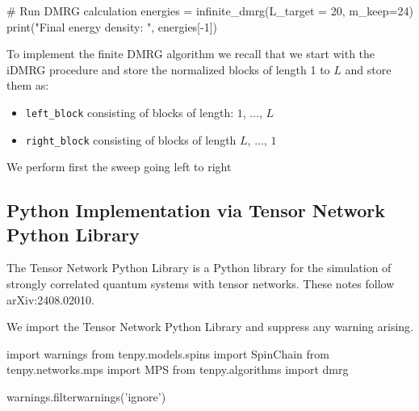\documentclass{article}
\begin{document}
\vspace{1em}

\begin{python}
    # Run DMRG calculation
    energies = infinite_dmrg(L_target = 20, m_keep=24)
    print("Final energy density: ", energies[-1])
\end{python}

\vspace{1em}

\noindent To implement the finite DMRG algorithm we recall that we start with the iDMRG procedure and store the normalized blocks of length 1 to $L$ and store them as:

\begin{itemize}
    \item \verb|left_block| consisting of blocks of length: $1$, ..., $L$
    \item \verb|right_block| consisting of blocks of length $L$, ..., $1$
\end{itemize}

\noindent We perform first the sweep going left to right

\vspace{1em}

\begin{python}

\end{python}

\subsection{Python Implementation via Tensor Network Python Library}

\noindent The Tensor Network Python Library is a Python library for the simulation of strongly correlated quantum systems with tensor networks. These notes follow arXiv:2408.02010. 

\vspace{1em}

\noindent We import the Tensor Network Python Library and suppress any warning arising.   

\begin{python}
import warnings
from tenpy.models.spins import SpinChain
from tenpy.networks.mps import MPS
from tenpy.algorithms import dmrg

warnings.filterwarnings('ignore')
\end{python}

\vspace{1em}
\end{document}
